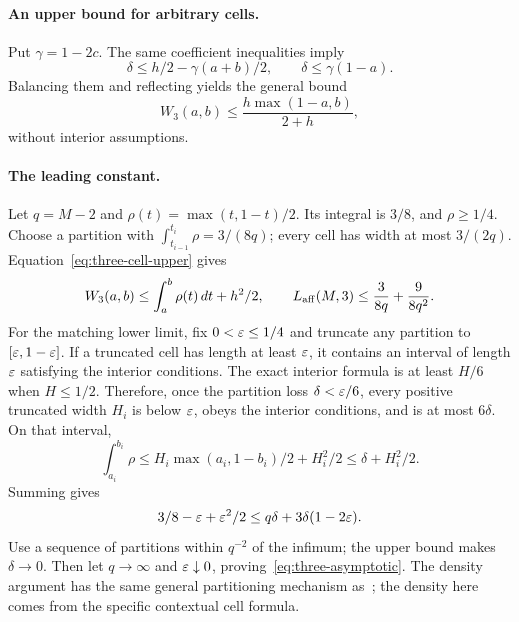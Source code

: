 \paragraph{An upper bound for arbitrary cells.}
Put $\gamma=1-2c$. The same coefficient inequalities imply
\[
\delta\le h/2-\gamma(a+b)/2,\qquad \delta\le\gamma(1-a).
\]
Balancing them and reflecting yields the general bound
\begin{equation}\label{eq:three-cell-upper}
W_3(a,b)\le \frac{h\max(1-a,b)}{2+h},
\end{equation}
without interior assumptions.

\paragraph{The leading constant.}
Let $q=M-2$ and $\rho(t)=\max(t,1-t)/2$. Its integral is $3/8$, and $\rho\ge1/4$. Choose a partition with $\int_{t_{i-1}}^{t_i}\rho=3/(8q)$; every cell has width at most $3/(2q)$. Equation~\eqref{eq:three-cell-upper} gives
\[
W_3(a,b)\le\int_a^b\rho(t)\,dt+h^2/2,
\qquad
L_{\mathrm{aff}}(M,3)\le\frac3{8q}+\frac9{8q^2}.
\]
For the matching lower limit, fix $0<\varepsilon\le1/4$ and truncate any partition to $[\varepsilon,1-\varepsilon]$. If a truncated cell has length at least $\varepsilon$, it contains an interval of length $\varepsilon$ satisfying the interior conditions. The exact interior formula is at least $H/6$ when $H\le1/2$. Therefore, once the partition loss $\delta<\varepsilon/6$, every positive truncated width $H_i$ is below $\varepsilon$, obeys the interior conditions, and is at most $6\delta$. On that interval,
\[
\int_{a_i}^{b_i}\rho\le
H_i\max(a_i,1-b_i)/2+H_i^2/2\le\delta+H_i^2/2.
\]
Summing gives
\[
3/8-\varepsilon+\varepsilon^2/2
\le q\delta+3\delta(1-2\varepsilon).
\]
Use a sequence of partitions within $q^{-2}$ of the infimum; the upper bound makes $\delta\to0$. Then let $q\to\infty$ and $\varepsilon\downarrow0$, proving~\eqref{eq:three-asymptotic}. The density argument has the same general partitioning mechanism as~\cite{tilli2019}; the density here comes from the specific contextual cell formula.
